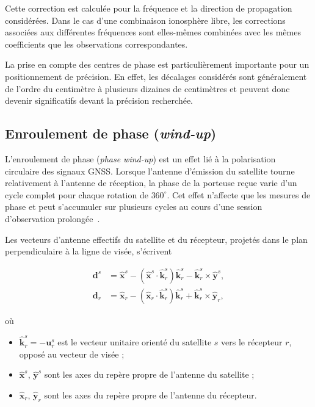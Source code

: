 Cette correction est calculée pour la fréquence et la direction de propagation
considérées. Dans le cas d'une combinaison ionosphère libre, les corrections
associées aux différentes fréquences sont elles-mêmes combinées avec les
mêmes coefficients que les observations correspondantes.

La prise en compte des centres de phase est particulièrement importante pour
un positionnement de précision. En effet, les décalages considérés sont
généralement de l'ordre du centimètre à plusieurs dizaines de centimètres et
peuvent donc devenir significatifs devant la précision recherchée.

\subsection{Enroulement de phase (\textit{wind-up})}\label{windup}

L'enroulement de phase (\textit{phase wind-up}) est un effet lié à la polarisation circulaire des signaux GNSS. Lorsque l'antenne d'émission du satellite tourne relativement à l'antenne de réception, la phase de la porteuse reçue varie d'un cycle complet pour chaque rotation de $360^\circ$. Cet effet n'affecte que les mesures de phase et peut s'accumuler sur plusieurs cycles au cours d'une session d'observation prolongée~\cite{wu1993}.

Les vecteurs d'antenne effectifs du satellite et du récepteur, projetés dans le plan perpendiculaire à la ligne de visée, s'écrivent

\begin{align}
\mathbf d^s
&=
\hat{\mathbf x}^s
-(\hat{\mathbf x}^s\cdot\hat{\mathbf k}_r^s)\hat{\mathbf k}_r^s
-\hat{\mathbf k}_r^s\times\hat{\mathbf y}^s,
\\
\mathbf d_r
&=
\hat{\mathbf x}_r
-(\hat{\mathbf x}_r\cdot\hat{\mathbf k}_r^s)\hat{\mathbf k}_r^s
+\hat{\mathbf k}_r^s\times\hat{\mathbf y}_r,
\end{align}

où

\begin{itemize}
    \item $\hat{\mathbf k}_r^s=-\mathbf u_r^s$ est le vecteur unitaire
    orienté du satellite $s$ vers le récepteur $r$, opposé au vecteur de visée ;
    \item $\hat{\mathbf x}^s$, $\hat{\mathbf y}^s$ sont les axes du repère propre de l'antenne du satellite ;
    \item $\hat{\mathbf x}_r$, $\hat{\mathbf y}_r$ sont les axes du repère propre de l'antenne du récepteur.
\end{itemize}

